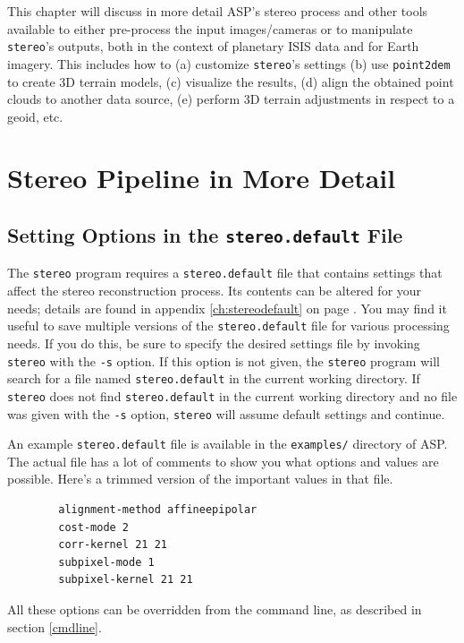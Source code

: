 This chapter will discuss in more detail ASP's stereo process and other
tools available to either pre-process the input images/cameras or to
manipulate \texttt{stereo}'s outputs, both in the context of planetary
ISIS data and for Earth imagery. This includes how to (a) customize
\texttt{stereo}'s settings (b) use \texttt{point2dem} to create 3D
terrain models, (c) visualize the results, (d) align the obtained point
clouds to another data source, (e) perform 3D terrain adjustments in
respect to a geoid, etc.


\section{Stereo Pipeline in More Detail}
\label{running-stereo}

\subsection{Setting Options in the \texttt{stereo.default} File}
\label{settingoptionsinstereodefault}

The \texttt{stereo} program requires a \texttt{stereo.default} file that
contains settings that affect the stereo reconstruction process.  Its
contents can be altered for your needs; details are found in appendix
\ref{ch:stereodefault} on page \pageref{ch:stereodefault}.  You may find
it useful to save multiple versions of the \texttt{stereo.default} file
for various processing needs. If you do this, be sure to specify the desired
settings file by invoking \texttt{stereo} with the \texttt{-s}
option.  If this option is not given, the \texttt{stereo} program will
search for a file named \texttt{stereo.default} in the current working
directory. If \texttt{stereo} does not find \texttt{stereo.default} in
the current working directory and no file was given with the \texttt{-s}
option, \texttt{stereo} will assume default settings and continue.

An example \texttt{stereo.default} file is available in the
\texttt{examples/} directory of \ac{ASP}. The actual file has a lot of
comments to show you what options and values are possible. Here's a
trimmed version of the important values in that file.
\begin{verbatim}
        alignment-method affineepipolar
        cost-mode 2
        corr-kernel 21 21
        subpixel-mode 1
        subpixel-kernel 21 21
\end{verbatim}

All these options can be overridden from the command line, as described
in section \ref{cmdline}.

